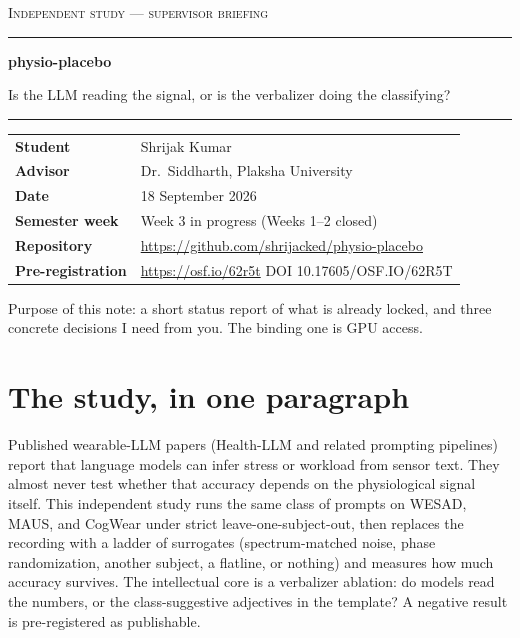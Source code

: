 \documentclass[11pt]{article}
\begin{document}
{\large\scshape\color{AccentSoft} Independent study --- supervisor briefing\par}
\vspace{0.35em}
{\color{Accent}\hrule height 1.0pt}
\vspace{0.7em}
{\LARGE\bfseries\color{Accent} physio-placebo\par}
\vspace{0.25em}
{\large Is the LLM reading the signal, or is the verbalizer doing the classifying?\par}
\vspace{0.7em}
{\color{Accent}\hrule height 1.0pt}
\vspace{0.85em}

\begin{tabular}{@{}L{3.4cm}L{12.1cm}@{}}
\textbf{Student} & Shrijak Kumar \\
\textbf{Advisor} & Dr.\ Siddharth, Plaksha University \\
\textbf{Date} & 18 September 2026 \\
\textbf{Semester week} & Week 3 in progress (Weeks 1--2 closed) \\
\textbf{Repository} & \url{https://github.com/shrijacked/physio-placebo} \\
\textbf{Pre-registration} & \url{https://osf.io/62r5t} \quad DOI 10.17605/OSF.IO/62R5T \\
\end{tabular}

\vspace{0.2em}
{\small\color{AccentSoft} Purpose of this note: a short status report of what is already locked, and three concrete decisions I need from you. The binding one is GPU access.\par}

\section{The study, in one paragraph}

Published wearable-LLM papers (Health-LLM and related prompting pipelines) report that language models can infer stress or workload from sensor text. They almost never test whether that accuracy depends on the physiological signal itself. This independent study runs the same class of prompts on WESAD, MAUS, and CogWear under strict leave-one-subject-out, then replaces the recording with a ladder of surrogates (spectrum-matched noise, phase randomization, another subject, a flatline, or nothing) and measures how much accuracy survives. The intellectual core is a verbalizer ablation: do models read the numbers, or the class-suggestive adjectives in the template? A negative result is pre-registered as publishable.
\end{document}
